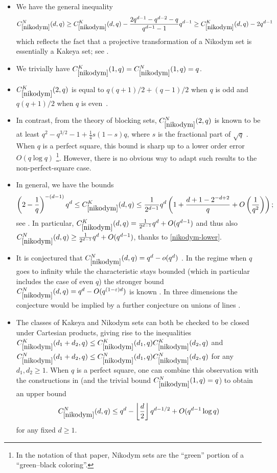 \begin{itemize}
    \item We have the general inequality
\begin{equation}\label{nikodym-lower}
C^N_{\ref{nikodym}}(d,q) \geq C^K_{\ref{nikodym}}(d,q) - \frac{2q^{d-1}-q^{d-2}-q}{q^{d-1}-1} q^{d-1} \geq C^K_{\ref{nikodym}}(d,q) - 2q^{d-1}
\end{equation}
    which reflects the fact that a projective transformation of a Nikodym set is essentially a Kakeya set; see \cite{tao-nikodym}.
    \item We trivially have $C^K_{\ref{nikodym}}(1,q) = C^N_{\ref{nikodym}}(1,q)=q$.
    \item $C^K_{\ref{nikodym}}(2,q)$ is equal to $q(q+1)/2 + (q-1)/2$ when $q$ is odd and $q(q+1)/2$ when $q$ is even~\cite{lund,block}.
    \item In contrast, from the theory of blocking sets, $C^N_{\ref{nikodym}}(2,q)$ is known to be at least $q^2 - q^{3/2} - 1 + \frac{1}{4}s(1-s)q$, where $s$ is the fractional part of $\sqrt{q}$ \cite{szonyi}.  When $q$ is a perfect square, this bound is sharp up to a lower order error $O(q \log q)$ \cite{block-error}\footnote{In the notation of that paper, Nikodym sets are the ``green'' portion of a ``green--black coloring''.}.  However, there is no obvious way to adapt such results to the non-perfect-square case.
    \item In general, we have the bounds
    $$ \left(2 - \frac{1}{q}\right)^{-(d-1)} q^{d} \leq C^K_{\ref{nikodym}}(d,q) \leq \frac{1}{2^{d-1}} q^d \left(1 + \frac{d+1-2^{-d+2}}{q} + O\left(\frac{1}{q^2}\right)\right);$$
    see \cite{bukh-chao}.  In particular, $C^K_{\ref{nikodym}}(d,q) = \frac{1}{2^{d-1}} q^d + O(q^{d-1})$ and thus also
    $C^N_{\ref{nikodym}}(d,q) \geq \frac{1}{2^{d-1}} q^d + O(q^{d-1})$, thanks to \eqref{nikodym-lower}.
    \item It is conjectured that $C^N_{\ref{nikodym}}(d,q) = q^d - o(q^d)$ \cite[Conjecture 1.2]{lund}.  In the regime when $q$ goes to infinity while the characteristic stays bounded (which in particular includes the case of even $q$) the stronger bound $C^N_{\ref{nikodym}}(d,q) = q^d - O(q^{(1-\varepsilon)d})$ is known \cite[Theorem 1.6]{guo}. In three dimensions the conjecture would be implied by a further conjecture on unions of lines \cite[Conjecture 1.4]{lund}.
    \item The classes of Kakeya and Nikodym sets can both be checked to be closed under Cartesian products, giving rise to the inequalities $C^K_{\ref{nikodym}}(d_1+d_2,q) \leq C^K_{\ref{nikodym}}(d_1,q) C^K_{\ref{nikodym}}(d_2,q)$ and $C^N_{\ref{nikodym}}(d_1+d_2,q) \leq C^N_{\ref{nikodym}}(d_1,q) C^N_{\ref{nikodym}}(d_2,q)$ for any $d_1,d_2 \geq 1$.  When $q$ is a perfect square, one can combine this observation with the constructions in \cite{block-error} (and the trivial bound $C^N_{\ref{nikodym}}(1,q)=q$) to obtain an upper bound
    $$ C^N_{\ref{nikodym}}(d,q) \leq q^d - \left\lfloor \frac{d}{2} \right\rfloor q^{d-1/2} + O(q^{d-1} \log q)$$
    for any fixed $d \geq 1$.
\end{itemize}




